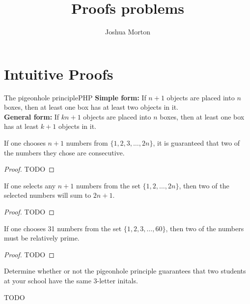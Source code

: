 \documentclass{report}
\begin{document}
\title{Proofs problems}
\author{Joshua Morton}
\maketitle

\chapter{Intuitive Proofs}

\begin{fact}{The pigeonhole principle}{PHP}
  \textbf{Simple form:} If $n + 1$ objects are placed into $n$ boxes, then at least one box has at least two objects in it. \\
  \textbf{General form:} If $kn + 1$ objects are placed into $n$ boxes, then at least one box has at least $k + 1$ objects in it.
\end{fact}

\begin{proposition*}{}
  If one chooses $n+1$ numbers from $\{1, 2, 3, \ldots, 2n\}$, it is guaranteed that two of the numbers they chose are consecutive.
\end{proposition*}

\begin{proof}
  TODO
\end{proof}

\begin{proposition*}{}
  If one selects any $n + 1$ numbers from the set $\{1, 2,\ldots,2n\}$, then two of the selected numbers will sum to $2n + 1.$
\end{proposition*}

\begin{proof}
  TODO
\end{proof}

\begin{proposition*}{}
  If one chooses 31 numbers from the set $\{1,2,3,\ldots,60\}$, then two of the numbers must be relatively prime.
\end{proposition*}

\begin{proof}
  TODO
\end{proof}

\begin{problem*}{}
  Determine whether or not the pigeonhole principle guarantees that two students at your school have the same 3-letter initals.
\end{problem*}

TODO
\end{document}
